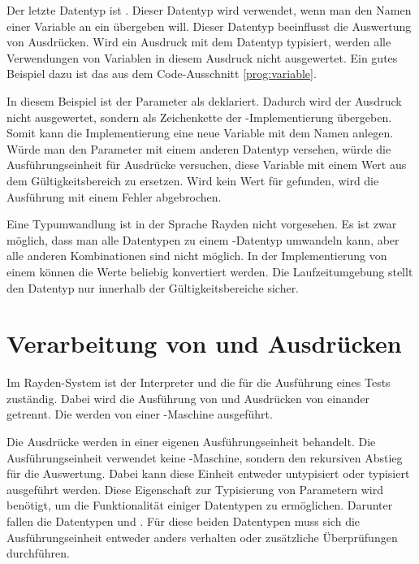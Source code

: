 \SuperPar
Der letzte Datentyp ist . Dieser Datentyp wird verwendet, wenn man den Namen einer Variable an ein  übergeben will. Dieser Datentyp beeinflusst die Auswertung von Ausdrücken. Wird ein Ausdruck mit dem Datentyp  typisiert, werden alle Verwendungen von Variablen in diesem Ausdruck nicht ausgewertet. Ein gutes Beispiel dazu ist das  aus dem Code-Ausschnitt \ref{prog:variable}.

\SuperPar
In diesem Beispiel ist der Parameter  als  deklariert. Dadurch wird der Ausdruck  nicht ausgewertet, sondern als Zeichenkette der -Implementierung übergeben. Somit kann die Implementierung eine neue Variable mit dem Namen  anlegen. Würde man den Parameter  mit einem anderen Datentyp versehen, würde die Ausführungseinheit für Ausdrücke versuchen, diese Variable mit einem Wert aus dem Gültigkeitsbereich zu ersetzen. Wird kein Wert für \enword{} gefunden, wird die Ausführung mit einem Fehler abgebrochen.

\SuperPar
Eine Typumwandlung ist in der Sprache Rayden nicht vorgesehen. Es ist zwar möglich, dass man alle Datentypen zu einem -Datentyp umwandeln kann, aber alle anderen Kombinationen sind nicht möglich. In der Implementierung von einem  können die Werte beliebig konvertiert werden. Die Laufzeitumgebung stellt den Datentyp nur innerhalb der Gültigkeitsbereiche sicher.

\section{Verarbeitung von  und Ausdrücken}

Im Rayden-System ist der Interpreter und die  für die Ausführung eines Tests zuständig. Dabei wird die Ausführung von  und Ausdrücken von einander getrennt. Die  werden von einer -Maschine ausgeführt. 

\SuperPar
Die Ausdrücke werden in einer eigenen Ausführungseinheit behandelt. Die Ausführungseinheit verwendet keine -Maschine, sondern den rekursiven Abstieg für die Auswertung. Dabei kann diese Einheit entweder untypisiert oder typisiert ausgeführt werden. Diese Eigenschaft zur Typisierung von Parametern wird benötigt, um die Funktionalität einiger Datentypen zu ermöglichen. Darunter fallen die Datentypen  und . Für diese beiden Datentypen muss sich die Ausführungseinheit entweder anders verhalten oder zusätzliche Überprüfungen durchführen. 

